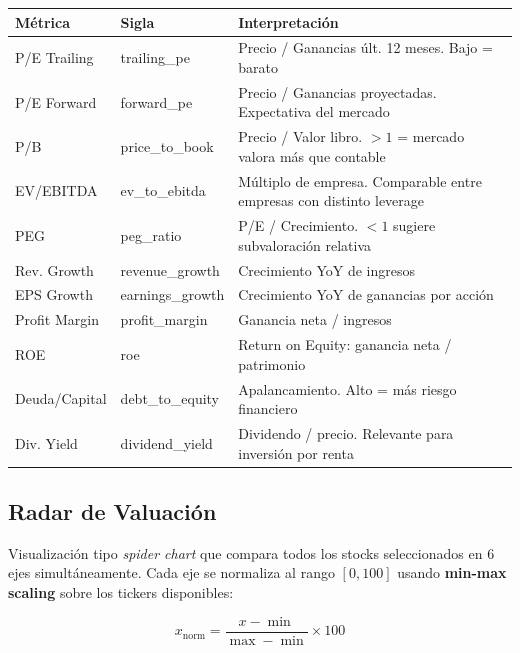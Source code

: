 \documentclass[11pt, a4paper]{article}
\begin{document}
\begin{center}
\begin{tabularx}{\textwidth}{llX}
  \toprule
  \textbf{Métrica} & \textbf{Sigla} & \textbf{Interpretación} \\
  \midrule
  P/E Trailing  & trailing\_pe & Precio / Ganancias últ. 12 meses. Bajo = barato \\
  P/E Forward   & forward\_pe  & Precio / Ganancias proyectadas. Expectativa del mercado \\
  P/B           & price\_to\_book & Precio / Valor libro. $> 1$ = mercado valora más que contable \\
  EV/EBITDA     & ev\_to\_ebitda  & Múltiplo de empresa. Comparable entre empresas con distinto leverage \\
  PEG           & peg\_ratio     & P/E / Crecimiento. $< 1$ sugiere subvaloración relativa \\
  Rev. Growth   & revenue\_growth & Crecimiento YoY de ingresos \\
  EPS Growth    & earnings\_growth & Crecimiento YoY de ganancias por acción \\
  Profit Margin & profit\_margin  & Ganancia neta / ingresos \\
  ROE           & roe            & Return on Equity: ganancia neta / patrimonio \\
  Deuda/Capital & debt\_to\_equity & Apalancamiento. Alto = más riesgo financiero \\
  Div. Yield    & dividend\_yield & Dividendo / precio. Relevante para inversión por renta \\
  \bottomrule
\end{tabularx}
\end{center}

\subsection{Radar de Valuación}

Visualización tipo \textit{spider chart} que compara todos los stocks seleccionados en 6 ejes simultáneamente. Cada eje se normaliza al rango $[0, 100]$ usando \textbf{min-max scaling} sobre los tickers disponibles:

\[
  x_{\text{norm}} = \frac{x - \min}{\max - \min} \times 100
\]
\end{document}

